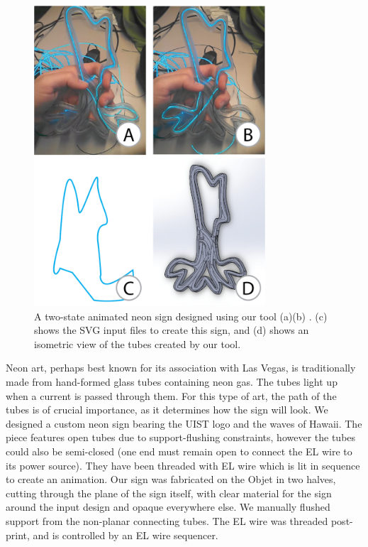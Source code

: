 \begin{figure}[h]
\centering
    \includegraphics[width=3.4in]{figures/sign.png}
\caption{A two-state animated neon sign designed using our tool (a)(b) .  (c) shows the SVG input files to create this sign, and (d) shows an isometric view of the tubes created by our tool. }
\label{fig:neon}
\end{figure}

Neon art, perhaps best known for its association with Las Vegas, is traditionally made from hand-formed glass tubes containing neon gas.  The tubes light up when a current is passed through them.  For this type of art, the path of the tubes is of crucial importance, as it determines how the sign will look.  We designed a custom neon sign bearing the UIST logo and the waves of Hawaii.  The piece features open tubes due to support-flushing constraints, however the tubes could also be semi-closed (one end must remain open to connect the EL wire to its power source).  They have been threaded with EL wire which is lit in sequence to create an animation.  Our sign was fabricated on the Objet in two halves, cutting through the plane of the sign itself, with clear material for the sign around the input design and opaque everywhere else.  We manually flushed support from the non-planar connecting tubes.  The EL wire was threaded post-print, and is controlled by an EL wire sequencer.
